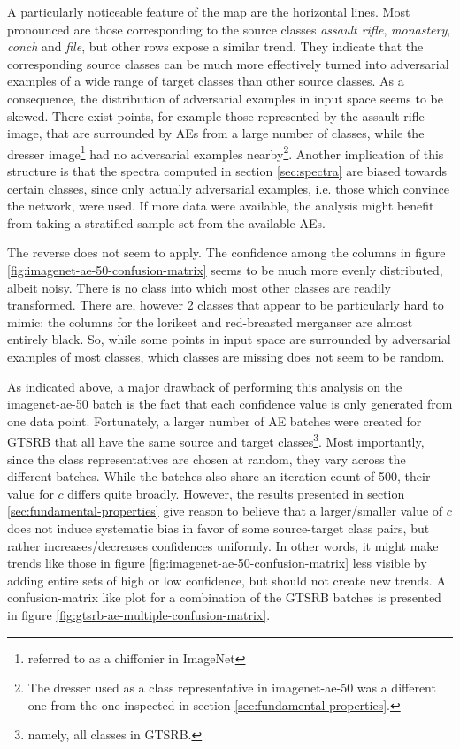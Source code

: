 \documentclass[11pt, a4paper]{article}
\begin{document}
A particularly noticeable feature of the map are the horizontal lines. Most pronounced are those corresponding to the source classes \emph{assault rifle}, \emph{monastery}, \emph{conch} and \emph{file}, but other rows expose a similar trend. They indicate that the corresponding source classes can be much more effectively turned into adversarial examples of a wide range of target classes than other source classes. As a consequence, the distribution of adversarial examples in input space seems to be skewed. There exist points, for example those represented by the assault rifle image, that are surrounded by AEs from a large number of classes, while the dresser image\footnote{referred to as a chiffonier in ImageNet} had no adversarial examples nearby\footnote{The dresser used as a class representative in imagenet-ae-50 was a different one from the one inspected in section \ref{sec:fundamental-properties}.}. Another implication of this structure is that the spectra computed in section \ref{sec:spectra} are biased towards certain classes, since only actually adversarial examples, i.e. those which convince the network, were used. If more data were available, the analysis might benefit from taking a stratified sample set from the available AEs.

The reverse does not seem to apply. The confidence among the columns in figure \ref{fig:imagenet-ae-50-confusion-matrix} seems to be much more evenly distributed, albeit noisy. There is no class into which most other classes are readily transformed. There are, however 2 classes that appear to be particularly hard to mimic: the columns for the lorikeet and red-breasted merganser are almost entirely black. So, while some points in input space are surrounded by adversarial examples of most classes, which classes are missing does not seem to be random. 

As indicated above, a major drawback of performing this analysis on the imagenet-ae-50 batch is the fact that each confidence value is only generated from one data point. Fortunately, a larger number of AE batches were created for GTSRB that all have the same source and target classes\footnote{namely, all classes in GTSRB.}. Most importantly, since the class representatives are chosen at random, they vary across the different batches. While the batches also share an iteration count of 500, their value for $c$ differs quite broadly. However, the results presented in section \ref{sec:fundamental-properties} give reason to believe that a larger/smaller value of $c$ does not induce systematic bias in favor of some source-target class pairs, but rather increases/decreases confidences uniformly. In other words, it might make trends like those in figure \ref{fig:imagenet-ae-50-confusion-matrix} less visible by adding entire sets of high or low confidence, but should not create new trends. A confusion-matrix like plot for a combination of the GTSRB batches is presented in figure \ref{fig:gtsrb-ae-multiple-confusion-matrix}.
\end{document}
